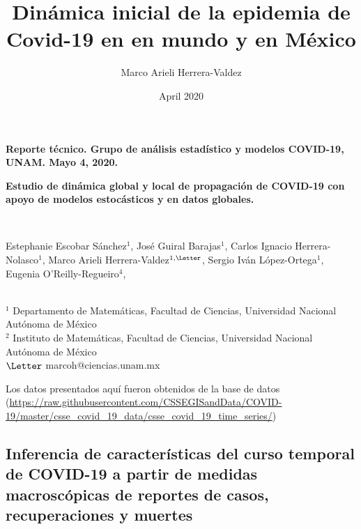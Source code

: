 \documentclass[8pt]{article}
\title{Dinámica inicial de la epidemia de Covid-19 en en mundo y en México }
\author{Marco Arieli Herrera-Valdez}
\date{April 2020}
\begin{document}
%
\begin{flushleft}
\textbf{Reporte técnico. Grupo de análisis estadístico  y modelos COVID-19, UNAM. Mayo 4, 2020.}\\
\smallskip 
\begin{Large}
\textbf{Estudio de dinámica global y local de propagación de COVID-19 con apoyo de modelos estocásticos y en datos globales. }
\end{Large}\\
\smallskip
\begin{large}
Estephanie Escobar Sánchez$^1$, José Guiral Barajas$^1$, Carlos Ignacio Herrera-Nolasco$^1$, Marco Arieli Herrera-Valdez$^{1,\email}$, Sergio Iván López-Ortega$^1$, Eugenia O'Reilly-Regueiro$^{4}$,
\end{large}\\
\smallskip
$^1$ Departamento de Matemáticas, Facultad de Ciencias, Universidad Nacional Autónoma de México\\
$^2$ Instituto de Matemáticas, Facultad de Ciencias, Universidad Nacional Autónoma de México\\
$\email$ marcoh@ciencias.unam.mx
\end{flushleft}
%

Los datos presentados aquí fueron obtenidos de la base de datos (\url{https://raw.githubusercontent.com/CSSEGISandData/COVID-19/master/csse_covid_19_data/csse_covid_19_time_series/})

\subsection*{Inferencia de características del curso temporal de COVID-19 a partir de medidas macroscópicas de reportes de casos, recuperaciones y muertes}
\end{document}
